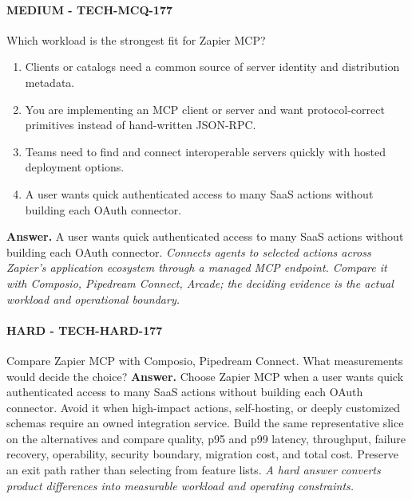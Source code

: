 \paragraph{MEDIUM - TECH-MCQ-177} Which workload is the strongest fit for Zapier MCP?
\begin{enumerate}[label=\Alph*.]
\item Clients or catalogs need a common source of server identity and distribution metadata.
\item You are implementing an MCP client or server and want protocol-correct primitives instead of hand-written JSON-RPC.
\item Teams need to find and connect interoperable servers quickly with hosted deployment options.
\item A user wants quick authenticated access to many SaaS actions without building each OAuth connector.
\end{enumerate}
\textbf{Answer.} A user wants quick authenticated access to many SaaS actions without building each OAuth connector.
\textit{Connects agents to selected actions across Zapier's application ecosystem through a managed MCP endpoint. Compare it with Composio, Pipedream Connect, Arcade; the deciding evidence is the actual workload and operational boundary.}
\paragraph{HARD - TECH-HARD-177} Compare Zapier MCP with Composio, Pipedream Connect. What measurements would decide the choice?
\textbf{Answer.} Choose Zapier MCP when a user wants quick authenticated access to many SaaS actions without building each OAuth connector. Avoid it when high-impact actions, self-hosting, or deeply customized schemas require an owned integration service. Build the same representative slice on the alternatives and compare quality, p95 and p99 latency, throughput, failure recovery, operability, security boundary, migration cost, and total cost. Preserve an exit path rather than selecting from feature lists.
\textit{A hard answer converts product differences into measurable workload and operating constraints.}
